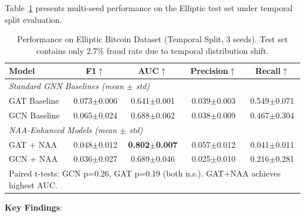 Table~\ref{tab:elliptic_main} presents multi-seed performance on the Elliptic test set under temporal split evaluation.

\begin{table}[t]
\centering
\caption{Performance on Elliptic Bitcoin Dataset (Temporal Split, 3 seeds). Test set contains only 2.7\% fraud rate due to temporal distribution shift.}
\label{tab:elliptic_main}
\small
\begin{tabular}{lcccc}
\toprule
\textbf{Model} & \textbf{F1}$\uparrow$ & \textbf{AUC}$\uparrow$ & \textbf{Precision}$\uparrow$ & \textbf{Recall}$\uparrow$ \\
\midrule
\multicolumn{5}{l}{\textit{Standard GNN Baselines (mean $\pm$ std)}} \\
GAT Baseline & 0.073$\pm$0.006 & 0.641$\pm$0.001 & 0.039$\pm$0.003 & 0.549$\pm$0.071 \\
GCN Baseline & 0.065$\pm$0.024 & 0.688$\pm$0.062 & 0.038$\pm$0.009 & 0.467$\pm$0.304 \\
\midrule
\multicolumn{5}{l}{\textit{NAA-Enhanced Models (mean $\pm$ std)}} \\
GAT + NAA & 0.048$\pm$0.012 & \textbf{0.802$\pm$0.007} & 0.057$\pm$0.012 & 0.041$\pm$0.011 \\
GCN + NAA & 0.036$\pm$0.027 & 0.689$\pm$0.046 & 0.025$\pm$0.010 & 0.216$\pm$0.281 \\
\bottomrule
\multicolumn{5}{l}{\footnotesize Paired t-tests: GCN p=0.26, GAT p=0.19 (both n.s.). GAT+NAA achieves highest AUC.} \\
\end{tabular}
\end{table}

\textbf{Key Findings}:

